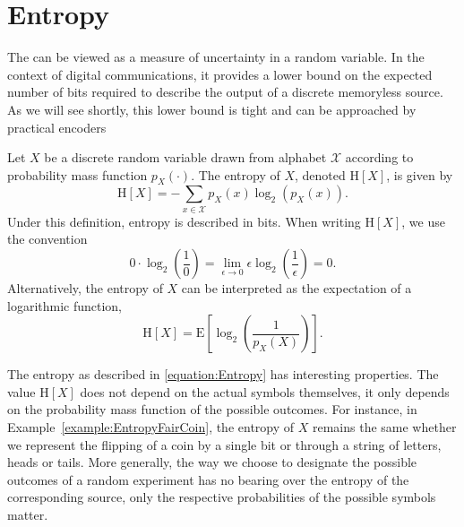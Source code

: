 \section{Entropy}

The  can be viewed as a measure of uncertainty in a random variable.
In the context of digital communications,
it provides a lower bound on the expected number of bits required to describe the output of a discrete memoryless source.
As we will see shortly, this lower bound is tight and can be approached by practical encoders

\begin{definition}[Entropy]
Let $X$ be a discrete random variable drawn from alphabet $\mathcal{X}$ according to probability mass function $p_X(\cdot)$.
The entropy of $X$, denoted $\mathrm{H}[X]$, is given by
\begin{equation} \label{equation:Entropy}
\mathrm{H}[X] = - \sum_{x \in \mathcal{X}} p_X (x) \log_2 ( p_X(x) ) .
\end{equation}
Under this definition, entropy is described in bits.
When writing $\mathrm{H}[X]$, we use the convention
\begin{equation*}
0 \cdot \log_2 \left( \frac{1}{0} \right)
= \lim_{\epsilon \rightarrow 0} \epsilon \log_2 \left( \frac{1}{\epsilon} \right)
= 0 .
\end{equation*}
Alternatively, the entropy of $X$ can be interpreted as the expectation of a logarithmic function,
\begin{equation*}
\mathrm{H}[X] = \mathrm{E} \left[ \log_2 \left( \frac{1}{p_X(X)} \right) \right] .
\end{equation*}
\end{definition}

The entropy as described in \eqref{equation:Entropy} has interesting properties.
The value $\mathrm{H}[X]$ does not depend on the actual symbols themselves, it only depends on the probability mass function of the possible outcomes.
For instance, in Example~\ref{example:EntropyFairCoin}, the entropy of $X$ remains the same whether we represent the flipping of a coin by a single bit or through a string of letters, heads or tails.
More generally, the way we choose to designate the possible outcomes of a random experiment has no bearing over the entropy of the corresponding source, only the respective probabilities of the possible symbols matter.

